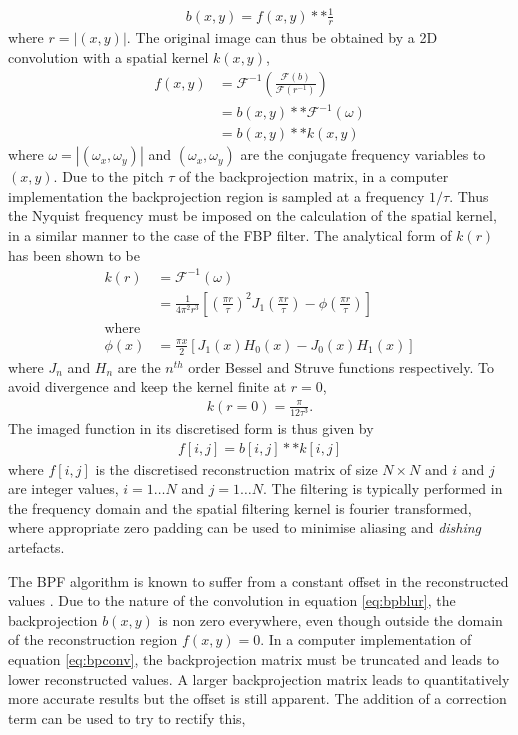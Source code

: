 \documentclass[11pt,a4paper]{article}
\begin{document}
\begin{eqnarray}
\label{eq:bpblur}
b(x,y) = f(x,y) ** \frac{1}{r}
\end{eqnarray}
where $r = |(x,y)|$. The original image can thus be obtained by a 2D convolution with a spatial kernel $k(x,y)$,
\begin{align}
f(x,y) & = \mathcal{F}^{-1}\left(\frac{\mathcal{F}(b)}{\mathcal{F}(r^{-1})}\right) \\
& = b(x,y) ** \mathcal{F}^{-1}(\omega) \nonumber\\
& = b(x,y) ** k(x,y) \nonumber
\end{align}
where $\omega = |(\omega_x,\omega_y)|$ and $(\omega_x,\omega_y)$ are the conjugate frequency variables to $(x,y)$. Due to the pitch $\tau$ of the backprojection matrix, in a computer implementation the backprojection region is sampled at a frequency $1/\tau$. Thus the Nyquist frequency must be imposed on the calculation of the spatial kernel, in a similar manner to the case of the FBP filter. The analytical form of $k(r)$ has been shown to be \parencite{poludniowski2014proton}
\begin{align}
k(r) & = \mathcal{F}^{-1}(\omega) \\
& = \frac{1}{4\pi^2r^3}\left[\left(\frac{\pi r}{\tau}\right)^2 J_1\left(\frac{\pi r}{\tau}\right) - \phi\left(\frac{\pi r}{\tau}\right)\right] \nonumber\\
\text{where} & \nonumber\\
\phi(x) & = \frac{\pi x}{2} [ J_1(x) H_0(x) - J_0(x) H_1(x)]\nonumber
\end{align}
where $J_n$ and $H_{n}$ are the $n^{th}$ order Bessel and Struve functions respectively. To avoid divergence and keep the kernel finite at $r = 0$, 
\begin{align}
k(r=0) = \frac{\pi}{12\tau^3}.
\end{align}
The imaged function in its discretised form is thus given by
\begin{eqnarray}
f[i,j] = b[i,j] ** k[i,j] 
\label{eq:bpconv}
\end{eqnarray}
where $f[i,j]$ is the discretised reconstruction matrix of size $N \times N$ and $i$ and $j$ are integer values, $i = 1 \dots N$  and $j = 1 \dots N$. The filtering is typically performed in the frequency domain and the spatial filtering kernel is fourier transformed, where appropriate zero padding can be used to minimise aliasing and \textit{dishing} artefacts.

The BPF algorithm is known to suffer from a constant offset in the reconstructed values \parencite{suzuki1988comparison}. Due to the nature of the convolution in equation \ref{eq:bpblur}, the backprojection $b(x,y)$ is non zero everywhere, even though outside the domain of the reconstruction region $f(x,y) = 0$. In a computer implementation of equation \ref{eq:bpconv}, the backprojection matrix must be truncated and leads to lower reconstructed values. A larger backprojection matrix leads to quantitatively more accurate results but the offset is still apparent. The addition of a correction term can be used to try to rectify this,
\end{document}
